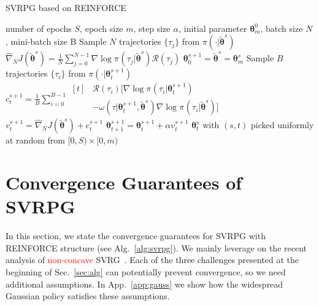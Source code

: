 \documentclass{article}
\theoremstyle{remark}
\theoremstyle{definition}
\newcommand{\vtheta}{\boldsymbol{\theta}}
\newcommand{\Reward}{\mathcal{R}}
\newcommand{\score}[2]{\nabla\log\pi_{#1}(#2)}
\newcommand{\gradApp}[2]{\widehat{\nabla}_{#2}J(#1)}
\newcommand{\wt}[1]{\widetilde{#1}}
\begin{document}
\begin{algorithm}[tb]
        \caption{SVRPG based on REINFORCE}
	\label{alg:svrpg}
	\begin{algorithmic}
		 number of epochs $S$, epoch size $m$, step size $\alpha$, initial parameter $\vtheta_{m}^0$, batch size $N$, mini-batch size B
        \STATE Sample $N$ trajectories $\{\tau_j\}$ from $\pi(\cdot\vert\tilde{\vtheta}^{s})$
		\STATE $\gradApp{\tilde{\vtheta}^{s}}{N} = \frac{1}{N}\sum_{j=0}^{N-1}\score{}{\tau_j\vert\tilde{\vtheta}^{s}}\Reward(\tau_j)$
		\STATE $\vtheta_0^{s+1} = \tilde{\vtheta}^s = \vtheta_{m}^s$
        \STATE Sample $B$ trajectories $\{\tau_i\}$ from $\pi(\cdot\vert\vtheta_t^{s+1})$
        \STATE $c^{s+1}_t = \frac{1}{B} \sum\limits_{i=0}^{B-1}
        \begin{aligned}[t]
                & \Reward(\tau_i) \Big[ \score{}{\tau_i|\vtheta_t^{s+1}} \\
                &- \omega(\tau|\vtheta^{s+1}_t, \wt{\vtheta}^s)\score{}{\tau_i|\wt{\vtheta}^{s}} \Big]
        \end{aligned}$
        \STATE $v^{s+1}_t = \gradApp{\wt{\vtheta}^{s}}{N} + c^{s+1}_t$
        \STATE $\vtheta_{t+1}^{s+1} = \vtheta_t^{s+1} + \alpha v^{s+1}_t$
		\ENDFOR
		\ENDFOR
		 $\vtheta_t^s$ with $(s,t)$ picked uniformly at random from $[0,S)\times[0,m)$
	\end{algorithmic}
\end{algorithm}

\section{Convergence Guarantees of SVRPG}\label{sec:conv}
In this section, we state the convergence guarantees for SVRPG with REINFORCE structure (see Alg.~\ref{alg:svrpg}).
We mainly leverage on the recent analysis of \textcolor{red}{non-concave} SVRG~\cite{reddi2016stochastic,allen2016variance}.
Each of the three challenges presented at the beginning of Sec.~\ref{sec:alg} can potentially prevent convergence, so we need additional assumptions.
In App.~\ref{app:gauss} we show how the widespread Gaussian policy satisfies these assumptions.
\end{document}
